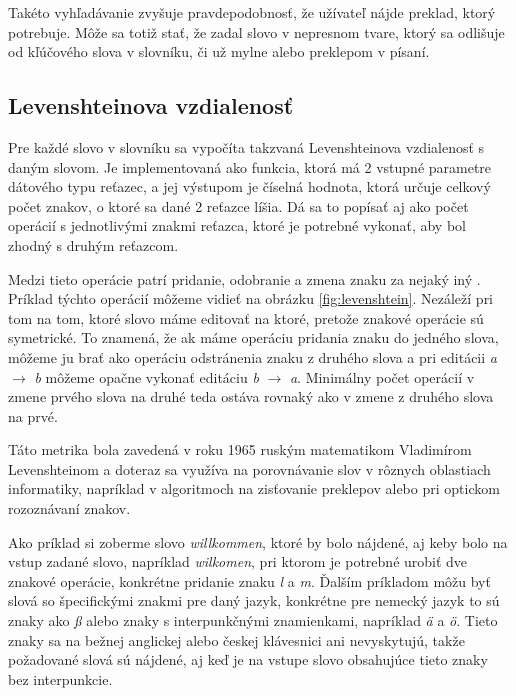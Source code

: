 \documentclass[
  digital, %
  table,   %
  lof,     %
  lot,     %
]{fithesis3}
\begin{document}
Takéto vyhľadávanie zvyšuje pravdepodobnosť, že užívateľ nájde preklad, ktorý potrebuje. Môže sa totiž stať, že zadal slovo v nepresnom tvare, ktorý sa odlišuje od kľúčového slova v slovníku, či už mylne alebo preklepom v písaní.


\subsection{Levenshteinova vzdialenosť}
Pre každé slovo v slovníku sa vypočíta takzvaná Levenshteinova vzdialenosť s daným slovom. Je implementovaná ako funkcia, ktorá má 2 vstupné parametre dátového typu reťazec, a jej výstupom je číselná hodnota, ktorá určuje celkový počet znakov, o ktoré sa dané 2 reťazce líšia. Dá sa to popísať aj ako počet operácií s jednotlivými znakmi reťazca, ktoré je potrebné vykonať, aby bol zhodný s druhým reťazcom.

Medzi tieto operácie patrí pridanie, odobranie a zmena znaku za nejaký iný \parencite{levenshtein1966binary}. Príklad týchto operácií môžeme vidieť na obrázku \ref{fig:levenshtein}. Nezáleží pri tom na tom, ktoré slovo máme editovať na ktoré, pretože znakové operácie sú symetrické. To znamená, že ak máme operáciu pridania znaku do jedného slova, môžeme ju brať ako operáciu odstránenia znaku z druhého slova a pri editácii \textit{a} $\rightarrow$ \textit{b} môžeme opačne vykonať editáciu \textit{b} $\rightarrow$ \textit{a}. Minimálny počet operácií v zmene prvého slova na druhé teda ostáva rovnaký ako v zmene z druhého slova na prvé.

Táto metrika bola zavedená v roku 1965 ruským matematikom Vladimírom Levenshteinom a doteraz sa využíva na porovnávanie slov v rôznych oblastiach informatiky, napríklad v algoritmoch na zisťovanie preklepov alebo pri optickom rozoznávaní znakov.

Ako príklad si zoberme slovo \textit{willkommen}, ktoré by bolo nájdené, aj keby bolo na vstup zadané slovo, napríklad \textit{wilkomen}, pri ktorom je potrebné urobiť dve znakové operácie, konkrétne pridanie znaku \textit{l} a \textit{m}. Ďalším príkladom môžu byť slová so špecifickými znakmi pre daný jazyk, konkrétne pre nemecký jazyk to sú znaky ako \textit{ß} alebo znaky s interpunkčnými znamienkami, napríklad \textit{ä} a \textit{ö}. Tieto znaky sa na bežnej anglickej alebo českej klávesnici ani nevyskytujú, takže požadované slová sú nájdené, aj keď je na vstupe slovo obsahujúce tieto znaky bez interpunkcie.
\end{document}
